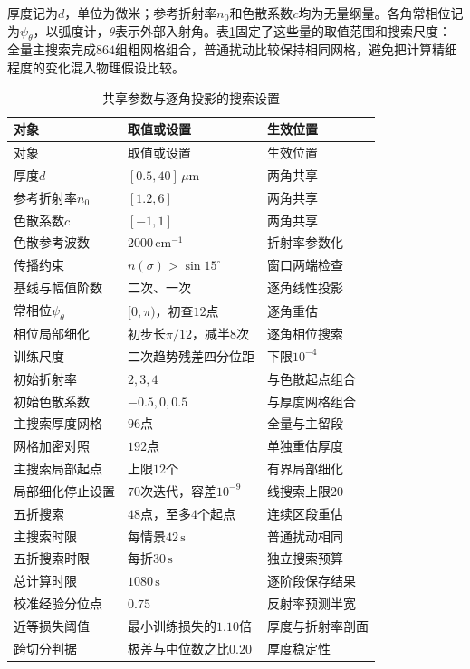厚度记为$d$，单位为微米；参考折射率$n_0$和色散系数$c$均为无量纲量。各角常相位记为$\psi_\theta$，以弧度计，$\theta$表示外部入射角。表\ref{tab:q2-app-search}固定了这些量的取值范围和搜索尺度：全量主搜索完成$864$组粗网格组合，普通扰动比较保持相同网格，避免把计算精细程度的变化混入物理假设比较。

\begingroup
\small
\renewcommand{\arraystretch}{1.12}
\begin{longtable}{>{\centering\arraybackslash}p{}>{\centering\arraybackslash}p{}>{\centering\arraybackslash}p{}}
\caption{共享参数与逐角投影的搜索设置}\label{tab:q2-app-search}\\
\toprule
对象 & 取值或设置 & 生效位置 \\
\midrule
\endfirsthead
\toprule
对象 & 取值或设置 & 生效位置 \\
\midrule
\endhead
\bottomrule
\endfoot
厚度$d$ & $[0.5,40]\,\mu\mathrm{m}$ & 两角共享 \\
参考折射率$n_0$ & $[1.2,6]$ & 两角共享 \\
色散系数$c$ & $[-1,1]$ & 两角共享 \\
色散参考波数 & $2000\,\mathrm{cm}^{-1}$ & 折射率参数化 \\
传播约束 & $n(\sigma)>\sin15^\circ$ & 窗口两端检查 \\
基线与幅值阶数 & 二次、一次 & 逐角线性投影 \\
常相位$\psi_\theta$ & $[0,\pi)$，初查$12$点 & 逐角重估 \\
相位局部细化 & 初步长$\pi/12$，减半$8$次 & 逐角相位搜索 \\
训练尺度 & 二次趋势残差四分位距 & 下限$10^{-4}$ \\
初始折射率 & $2,3,4$ & 与色散起点组合 \\
初始色散系数 & $-0.5,0,0.5$ & 与厚度网格组合 \\
主搜索厚度网格 & $96$点 & 全量与主留段 \\
网格加密对照 & $192$点 & 单独重估厚度 \\
主搜索局部起点 & 上限$12$个 & 有界局部细化 \\
局部细化停止设置 & $70$次迭代，容差$10^{-9}$ & 线搜索上限$20$ \\
五折搜索 & $48$点，至多$4$个起点 & 连续区段重估 \\
主搜索时限 & 每情景$42\,\mathrm{s}$ & 普通扰动相同 \\
五折搜索时限 & 每折$30\,\mathrm{s}$ & 独立搜索预算 \\
总计算时限 & $1080\,\mathrm{s}$ & 逐阶段保存结果 \\
校准经验分位点 & $0.75$ & 反射率预测半宽 \\
近等损失阈值 & 最小训练损失的$1.10$倍 & 厚度与折射率剖面 \\
跨切分判据 & 极差与中位数之比$0.20$ & 厚度稳定性 \\
\end{longtable}
\endgroup

